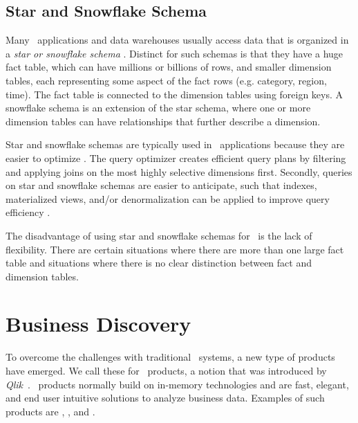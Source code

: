 \subsection{Star and Snowflake Schema}
\label{sub:Star and Snowflake Schema}
Many \bi~applications and data warehouses usually access data that is organized in a \textit{star or snowflake schema} \cite{Barber2012-xt}. Distinct for such schemas is that they have a huge fact table, which can have millions or billions of rows, and smaller dimension tables, each representing some aspect of the fact rows (e.g. category, region, time). The fact table is connected to the dimension tables using foreign keys. A snowflake schema is an extension of the star schema, where one or more dimension tables can have relationships that further describe a dimension.

Star and snowflake schemas are typically used in \bi~applications because they are easier to optimize \cite{Lamb2012-kg}. The query optimizer creates efficient query plans by filtering and applying joins on the most highly selective dimensions first. Secondly, queries on star and snowflake schemas are easier to anticipate, such that indexes, materialized views, and/or denormalization can be applied to improve query efficiency \cite{Barber2012-xt}.

The disadvantage of using star and snowflake schemas for \bi~is the lack of flexibility. There are certain situations where there are more than one large fact table and situations where there is no clear distinction between fact and dimension tables.

\section{Business Discovery}
\label{sec:Business Discovery}

To overcome the challenges with traditional \bi~systems, a new type of products have emerged. We call these for \bd~products, a notion that was introduced by \textit{Qlik}~\cite{Qlik2014-vd}. \bd~products normally build on in-memory technologies and are fast, elegant, and end user intuitive solutions to analyze business data. Examples of such products are \powerpivot, \tableau, and \qlikview. 




